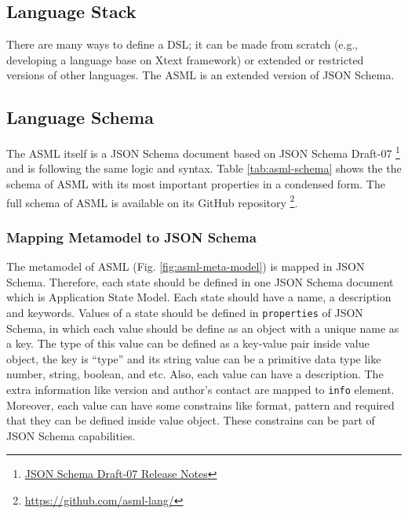 \subsection{Language Stack}
There are many ways to define a DSL; it can be made from scratch (e.g., developing a language base on Xtext framework) or extended or restricted versions of other languages. The ASML is an extended version of JSON Schema. 

\subsection{Language Schema}
The ASML itself is a JSON Schema document based on JSON Schema Draft-07
\footnote{\href{https://json-schema.org/draft-07/json-schema-release-notes.html}{JSON Schema Draft-07 Release Notes}}
and is following the same logic and syntax. Table \ref{tab:asml-schema} shows the the schema of ASML with its most important properties in a condensed form. 
The full schema of ASML is available on its GitHub repository
\footnote{\href{https://github.com/asml-lang/asml/blob/master/schemas/schema.json}{https://github.com/asml-lang/}}.

\subsubsection{Mapping Metamodel to JSON Schema}
The metamodel of ASML (Fig. \ref{fig:asml-meta-model}) is mapped in JSON Schema. Therefore, each state should be defined in one JSON Schema document which is Application State Model. Each state should have a name, a description and keywords. Values of a state should be defined in \lstinline[basicstyle=\ttfamily]{properties} of JSON Schema, in which each value should be define as an object with a unique name as a key. The type of this value can be defined as a key-value pair inside value object, the key is “type” and its string value can be a primitive data type like number, string, boolean, and etc. Also, each value can have a description. The extra information like version and author’s contact are mapped to \lstinline[basicstyle=\ttfamily]{info} element. Moreover, each value can have some constrains like format, pattern and required that they can be defined inside value object. These constrains can be part of JSON Schema capabilities.

